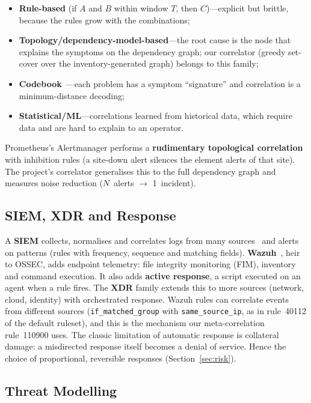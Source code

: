 \documentclass[11pt,a4paper]{article}
\begin{document}
\begin{itemize}
  \item \textbf{Rule-based} (if $A$ and $B$ within window $T$, then $C$)---explicit but
    brittle, because the rules grow with the combinations;
  \item \textbf{Topology/dependency-model-based}---the root cause is the node that explains
    the symptoms on the dependency graph; our correlator (greedy set-cover over the
    inventory-generated graph) belongs to this family;
  \item \textbf{Codebook}~\cite{kliger1995}---each problem has a symptom ``signature'' and
    correlation is a minimum-distance decoding;
  \item \textbf{Statistical/ML}---correlations learned from historical data, which require
    data and are hard to explain to an operator.
\end{itemize}

Prometheus's Alertmanager performs a \textbf{rudimentary topological correlation} with
inhibition rules (a site-down alert silences the element alerts of that site). The project's
correlator generalises this to the full dependency graph and measures noise reduction
($N$~alerts $\to$ 1~incident).

\subsection{SIEM, XDR and Response}

A \textbf{SIEM} collects, normalises and correlates logs from many
sources~\cite{chuvakin2012,scarfone2007} and alerts on patterns (rules with frequency,
sequence and matching fields). \textbf{Wazuh}~\cite{wazuh}, heir to OSSEC, adds endpoint
telemetry: file integrity monitoring (FIM), inventory and command execution. It also adds
\textbf{active response}, a script executed on an agent when a rule fires. The \textbf{XDR} family extends this to more sources (network, cloud, identity)
with orchestrated response. Wazuh rules can correlate events from different sources
(\texttt{if\_matched\_group} with \texttt{same\_source\_ip}, as in rule~40112 of the default
ruleset), and this is the mechanism our meta-correlation rule~110900 uses. The classic
limitation of automatic response is collateral damage: a misdirected response itself becomes
a denial of service. Hence the choice of proportional, reversible responses
(Section~\ref{sec:risk}).

\subsection{Threat Modelling}
\end{document}
